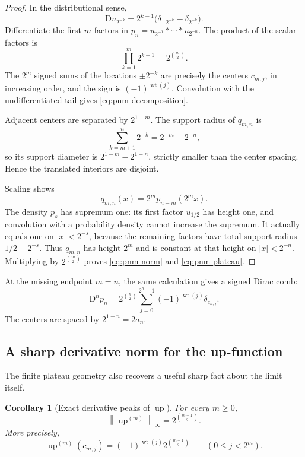 \documentclass[11pt,oneside]{article}
\newtheorem{corollary}[theorem]{Corollary}
\theoremstyle{definition}
\theoremstyle{remark}
\newcommand{\Up}{\operatorname{up}}
\newcommand{\conv}{*}
\newcommand{\wt}{\operatorname{wt}}
\newcommand{\norm}[1]{\left\lVert#1\right\rVert}
\newcommand{\D}{\mathrm D}
\begin{document}
\begin{proof}
In the distributional sense,
\begin{equation}
 \D u_{2^{-k}}=2^{k-1}\bigl(\delta_{-2^{-k}}-\delta_{2^{-k}}\bigr).
 \label{eq:uniform-derivative-delta}
\end{equation}
Differentiate the first $m$ factors in
$p_n=u_{2^{-1}}\conv\cdots\conv u_{2^{-n}}$.  The product of the scalar factors is
\[
 \prod_{k=1}^{m}2^{k-1}=2^{\binom m2}.
\]
The $2^m$ signed sums of the locations $\pm2^{-k}$ are precisely the centers
$c_{m,j}$, in increasing order, and the sign is $(-1)^{\wt(j)}$.  Convolution with the
undifferentiated tail gives \eqref{eq:pnm-decomposition}.

Adjacent centers are separated by $2^{1-m}$.  The support radius of $q_{m,n}$ is
\[
 \sum_{k=m+1}^{n}2^{-k}=2^{-m}-2^{-n},
\]
so its support diameter is $2^{1-m}-2^{1-n}$, strictly smaller than the center spacing.
Hence the translated interiors are disjoint.

Scaling shows
\begin{equation}
 q_{m,n}(x)=2^m p_{n-m}(2^mx).
 \label{eq:qmn-scaling}
\end{equation}
The density $p_s$ has supremum one: its first factor $u_{1/2}$ has height one, and
convolution with a probability density cannot increase the supremum.  It actually equals
one on $|x|<2^{-s}$, because the remaining factors have total support radius
$1/2-2^{-s}$.  Thus $q_{m,n}$ has height $2^m$ and is constant at that height on
$|x|<2^{-n}$.  Multiplying by $2^{\binom m2}$ proves
\eqref{eq:pnm-norm} and \eqref{eq:pnm-plateau}.
\end{proof}

At the missing endpoint $m=n$, the same calculation gives a signed Dirac comb:
\begin{equation}
 \D^np_n=2^{\binom n2}
 \sum_{j=0}^{2^n-1}(-1)^{\wt(j)}\delta_{c_{n,j}}.
 \label{eq:pn-top-delta-comb}
\end{equation}
The centers are spaced by $2^{1-n}=2a_n$.

\subsection{A sharp derivative norm for the up-function}

The finite plateau geometry also recovers a useful sharp fact about the limit itself.

\begin{corollary}[Exact derivative peaks of $\Up$]
\label{cor:up-derivative-norm}
For every $m\ge0$,
\begin{equation}
 \boxed{\displaystyle
 \norm{\Up^{(m)}}_\infty=2^{\binom{m+1}{2}}.}
 \label{eq:up-derivative-norm}
\end{equation}
More precisely,
\begin{equation}
 \Up^{(m)}(c_{m,j})=(-1)^{\wt(j)}2^{\binom{m+1}{2}}
 \qquad(0\le j<2^m).
 \label{eq:up-derivative-peaks}
\end{equation}
\end{corollary}
\end{document}
